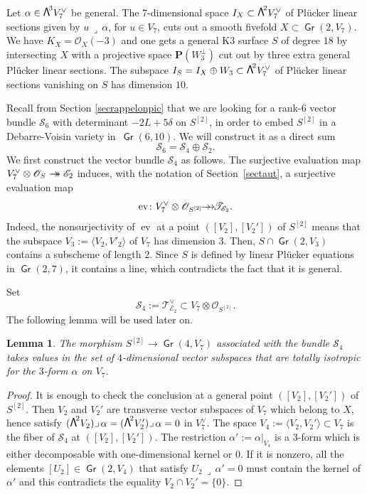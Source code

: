 \documentclass[JEP,XML,SOM,Unicode, NoEqCountersInSection,NoFloatCountersInSection]{cedram}
\let\mathcal\mathscr
\newcommand{\onto}{\mathchoice{\to\hspace*{-5mm}\to}{\to\hspace*{-2.85mm}\to}{\to\hspace*{-3mm}\to}{\to\hspace*{-3mm}\to}}
\newtheorem{lemm}{Lemma}[section]
\theoremstyle{definition}
\renewcommand\P{{\mathbf P}}\let\PP\P
\newcommand\cE{\mathcal{E}}
\newcommand\cO{\mathcal{O}}\let\OO\cO
\newcommand\cS{\mathcal{S}}\let\soustauto\cS
\newcommand\cT{\mathcal{T}}
\DeclareMathOperator{\Gr}{\mathsf{Gr}}
\let\dual\vee
\let\Ld L
\DeclareMathOperator{\ev}{ev}
\newcommand\bw[1]{{\hbox{\large$\mathsf{\Lambda}$}^{\!#1}}}
\newcommand\hilbS{S^{[2]}}
\begin{document}
Let $\alpha\in \bw3V_7^\dual $ be general. The 7-dimensional space $I_X\subset \bw2V_7^\dual $ of
Plücker linear sections given by $u\,\lrcorner\, \alpha$, for $u\in V_7$,
cuts out a smooth fivefold $X\subset \Gr(2,V_7)$. We have $K_X=\cO_X(-3)$ and
one gets a general K3 surface $S$ of degree $18$ by intersecting $X$ with a projective space $\P(W_3^\bot)$ cut out by three extra general Plücker linear sections. The subspace $I_S=I_X\oplus W_3\subset\bw2V_7^\dual $ of Plücker linear sections vanishing on $S$ has dimension $10$.

Recall from Section \ref{secrappelonpic} that we are looking for a rank-$6$ vector bundle $\cS_6$ with determinant $-2\Ld+5\delta$ on $\hilbS$, in order to embed $\hilbS$ in a Debarre-Voisin variety in~$\Gr(6,10)$. We will construct it as a direct sum
\[
\cS_6=\cS_4\oplus \cS_2.
\]
We first construct the vector bundle
$\cS_4$ as follows.
The surjective evaluation map
$V_7^\vee\otimes\cO_S\onto {\cE_2}$
induces, with the notation of Section~\ref{sectaut}, a surjective evaluation map
\[
\label{eqevpourtautonS}
\ev\colon V_7^\vee\otimes\cO_{\hilbS}\onto\cT_{ \cE_2}.
\]
Indeed,
the nonsurjectivity of $\ev$ at a point $([V_2],[V_2'])$ of $\hilbS$
means that the subspace $V_3:=\langle V_2,V'_2\rangle$ of
$ V_7$ has dimension $3$. Then, $S\cap \Gr(2,V_3)$ contains a subscheme of length $2$. Since $S$ is defined by linear Plücker equations in $\Gr(2,7)$, it contains a line, which contradicts the fact that it is general.

Set
\begin{equation}\label{s4}
\cS_4:=\cT_{\cE_2}^\vee \subset V_7\otimes\cO_{\hilbS}.
\end{equation}
The following lemma will be used later on.

\begin{lemm}\label{lepourtrivecteur}
The morphism $\hilbS\to \Gr(4,V_{7})$ associated with
the bundle $\cS_4$ takes values in the set of $4$-dimensional vector subspaces that are totally isotropic for the $3$-form
$\alpha$ on $V_7$.
\end{lemm}

\begin{proof} It is enough to check the conclusion at a general point $([V_2],[V_2'])$ of $\hilbS$. Then $V_2$ and $ V_2'$ are transverse vector subspaces
of $V_7$ which belong to $X$, hence satisfy $(\bw2V_2 )\lrcorner\,\alpha=(\bw2V_2' )\lrcorner\,\alpha=0$ in $V_7^\vee$.
The space $V_4:=\langle V_2,V_2'\rangle\subset V_7$ is the fiber of $\cS_4$ at $([V_2],[V_2'])$. The restriction $\alpha':=\alpha\vert_{ V_4}$
is a $3$-form which is either decomposable with one-dimensional kernel or $0$. If it is nonzero, all the elements
$[U_2]\in \Gr(2,V_4)$ that satisfy $U_2\,\lrcorner\,\alpha'=0$ must contain the kernel of $\alpha'$ and this contradicts the equality
$V_2\cap V_2'=\{0\}$.
\end{proof}
\end{document}
